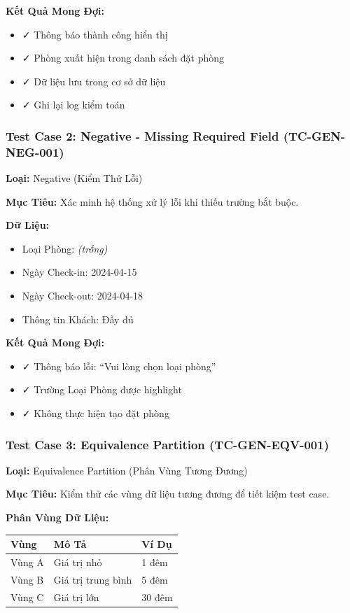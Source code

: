 \documentclass[12pt, a4paper]{article}
\begin{document}
\textbf{Kết Quả Mong Đợi:}
\begin{itemize}
    \item ✓ Thông báo thành công hiển thị
    \item ✓ Phòng xuất hiện trong danh sách đặt phòng
    \item ✓ Dữ liệu lưu trong cơ sở dữ liệu
    \item ✓ Ghi lại log kiểm toán
\end{itemize}

\subsubsection{Test Case 2: Negative - Missing Required Field (TC-GEN-NEG-001)}

\textbf{Loại:} Negative (Kiểm Thử Lỗi)

\textbf{Mục Tiêu:}
Xác minh hệ thống xử lý lỗi khi thiếu trường bắt buộc.

\textbf{Dữ Liệu:}
\begin{itemize}
    \item Loại Phòng: \textit{(trống)}
    \item Ngày Check-in: 2024-04-15
    \item Ngày Check-out: 2024-04-18
    \item Thông tin Khách: Đầy đủ
\end{itemize}

\textbf{Kết Quả Mong Đợi:}
\begin{itemize}
    \item ✓ Thông báo lỗi: ``Vui lòng chọn loại phòng''
    \item ✓ Trường Loại Phòng được highlight
    \item ✓ Không thực hiện tạo đặt phòng
\end{itemize}

\subsubsection{Test Case 3: Equivalence Partition (TC-GEN-EQV-001)}

\textbf{Loại:} Equivalence Partition (Phân Vùng Tương Đương)

\textbf{Mục Tiêu:}
Kiểm thử các vùng dữ liệu tương đương để tiết kiệm test case.

\textbf{Phân Vùng Dữ Liệu:}

\begin{table}[h]
\centering
\begin{tabular}{|l|l|l|}
\hline
\textbf{Vùng} & \textbf{Mô Tả} & \textbf{Ví Dụ} \\
\hline
Vùng A & Giá trị nhỏ & 1 đêm \\
Vùng B & Giá trị trung bình & 5 đêm \\
Vùng C & Giá trị lớn & 30 đêm \\
\hline
\end{tabular}
\end{table}
\end{document}
